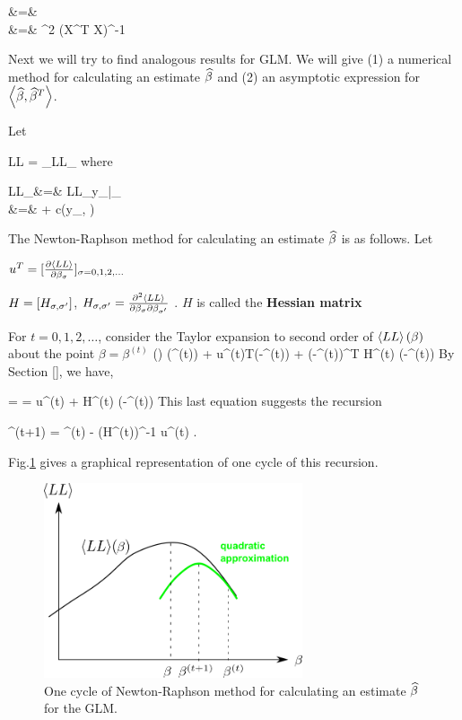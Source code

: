 \beqa
{}
&=&
\\
&=&
\s^2  (X^T X)^{-1}
\eeqa

Next
we will try to find analogous results for GLM.
We will give (1) a numerical method
for calculating an estimate
$\widehat{\beta}$
and (2) an asymptotic
expression for
$\left\langle\widehat{\beta}, \widehat{\beta}^T\right\rangle$.

Let

\beq
 LL =  \sum_\s  LL_\s
\eeq
where

\beqa
 LL_\s &=&   LL_{y_\s|\theta_\s }
\\
&=&
 + c(y_\s, \phi)
\eeqa

The
Newton-Raphson method for calculating an
estimate $\widehat{\beta}$ is as follows. Let

$u^T = [\frac{\partial\left\langle LL\right\rangle}{\partial\beta_\sigma}]_{\sigma=0,1,2, \ldots}$

 $H= [H_{\sigma, \sigma'}]$, $H_{\sigma, \sigma'} =
\frac{\partial^2 \left\langle LL\right\rangle }{\partial\beta_\sigma\partial\beta_{\sigma'}}$ .
$H$ is called the {\bf Hessian matrix}

For $t=0, 1, 2,\ldots$, consider the
Taylor expansion  to second order
of $\left\langle LL\right\rangle(\beta)$  about  the
point $\beta= \beta^{(t)}$
\beq
{}(\beta)
\approx
{}(\beta^{(t)})
+ u^{(t)T}(\beta-\beta^{(t)})
+ 
(\beta-\beta^{(t)})^T H^{(t)} (\beta-\beta^{(t)})
\eeq
 By Section [], we have,

 =
=
u^{(t)}
+
H^{(t)} (\beta-\beta^{(t)})
\eeq
This last equation suggests the recursion

\beq
\beta^{(t+1)} =
\beta^{(t)} -  (H^{(t)})^{-1} u^{(t)}
\;.
\eeq

Fig.\ref{fig-gml-new-rap}
gives a graphical
representation of
one cycle of this recursion.


\begin{figure}[h!]
\centering
\includegraphics[width=3in]
{gen-lin-mod/gen-lin-mod.png}
\caption{One cycle of Newton-Raphson method
for calculating an estimate $\widehat{\beta}$ for the GLM.}
\label{fig-gml-new-rap}
\end{figure}




